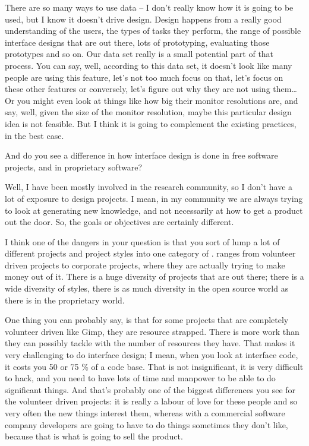 {There are so many ways to use data {--} I don't really know how it is
going to be used, but I know it doesn't drive design. Design happens
from a really good understanding of the users, the types of tasks they
perform, the range of possible interface designs that are out there,
lots of prototyping, evaluating those prototypes and so on. Our data
set really is a small potential part of that process. You can say,
well, according to this data set, it doesn't look like many people are
using this feature, let's not too much focus on that, let's focus on
these other features or conversely, let's figure out why they are not
using them{\dots} Or you might even look at things like how big their
monitor resolutions are, and say, well, given the size of the monitor
resolution, maybe this particular design idea is not feasible. But I
think it is going to complement the existing practices, in the best
case.\par 

 And do you see a difference in how interface design is done in
free software projects, and in proprietary software?\par

 Well, I have been mostly involved in the research community, so I
don't have a lot of exposure to design projects. I mean, in my
community we are always trying to look at generating new knowledge, and
not necessarily at how to get a product out the door. So, the goals or
objectives are certainly different.\par

I think one of the dangers in your question is that you sort of lump a
lot of different projects and project styles into one category of .  ranges from volunteer driven projects to
corporate projects, where they are actually trying to make money out of
it. There is a huge diversity of projects that are out there; there is
a wide diversity of styles, there is as much diversity in the open
source world as there is in the proprietary world.\par

One thing you can probably say, is that for some projects that are
completely volunteer driven like Gimp, they are resource strapped.
There is more work than they can possibly tackle with the number of
resources they have. That makes it very challenging to do interface
design; I mean, when you look at interface code, it costs you 50 or 75
\% of a code base. That is not insignificant, it is very difficult to
hack, and you need to have lots of time and manpower to be able to do
significant things. And that's probably one of the biggest differences
you see for the volunteer driven projects: it is really a labour of
love for these people and so very often the new things interest them,
whereas with a commercial software company developers are going to have
to do things sometimes they don't like, because that is what is going
to sell the product.\par}

